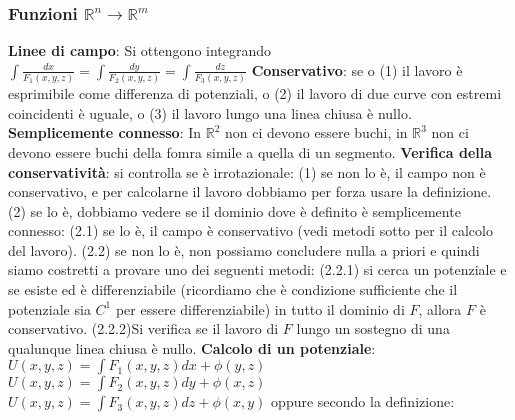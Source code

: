 \documentclass[fontsize=8pt]{scrartcl}
\begin{document}
\begin{multicols*}{4}
\subsubsection*{Funzioni $\mathbb{R}^n \rightarrow  \mathbb{R}^m$}
\textbf{Linee di campo}:\newline 
Si ottengono integrando $\int \frac{dx}{F_1(x,y,z)} = \int \frac{dy}{F_2(x,y,z)} = \int \frac{dz}{F_3(x,y,z)}$\newline
\textbf{Conservativo}:\newline 
se o (1) il lavoro è esprimibile come differenza di potenziali, o (2) il lavoro di due curve con estremi coincidenti è uguale, o (3) il lavoro lungo una linea chiusa è nullo.\newline
\textbf{Semplicemente connesso}:\newline
In $\mathbb{R}^2$ non ci devono essere buchi, in $\mathbb{R}^3$ non ci devono essere buchi della fomra simile a quella di un segmento.\newline
\textbf{Verifica della conservatività}:\newline
si controlla se è irrotazionale:\newline
(1) se non lo è, il campo non è conservativo, e per calcolarne il lavoro dobbiamo per forza usare la definizione.\newline
(2) se lo è, dobbiamo vedere se il dominio dove è definito è semplicemente connesso:\newline
(2.1) se lo è, il campo è conservativo (vedi metodi sotto per il calcolo del lavoro).\newline
(2.2) se non lo è, non possiamo concludere nulla a priori e quindi siamo costretti a provare uno dei seguenti metodi:\newline
(2.2.1) si cerca un potenziale e se esiste ed è differenziabile (ricordiamo che è condizione sufficiente che il potenziale sia $C^1$ per essere differenziabile) in tutto il dominio di $F$, allora $F$ è conservativo.\newline
(2.2.2)Si verifica se il lavoro di $F$ lungo un sostegno di una qualunque linea chiusa è nullo.\newline
\textbf{Calcolo di un potenziale}:\newline
$U(x,y,z) = \int F_1(x,y,z) dx + \phi(y,z)$\newline
$U(x,y,z) = \int F_2(x,y,z) dy + \phi(x,z)$\newline
$U(x,y,z) = \int F_3(x,y,z) dz + \phi(x,y)$\newline
oppure secondo la definizione:\newline

\end{multicols*}
\end{document}
